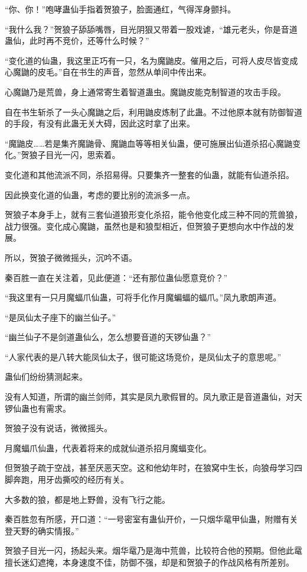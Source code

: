 \begin{this_body}
“你、你！”咆哮蛊仙手指着贺狼子，脸面通红，气得浑身颤抖。

“我什么我？”贺狼子舔舔嘴唇，目光阴狠又带着一股戏谑，“雄元老头，你是音道蛊仙，此时再不竞价，还等什么时候？”

“变化道的仙蛊，我这里正巧有一只，名为魔鼬皮。催用之后，可将人皮尽皆变成心魔鼬的皮毛。”自在书生的声音，忽然从单间中传出来。

心魔鼬乃是荒兽，身上通常寄生着智道蛊虫。魔鼬皮能克制智道的攻击手段。

自在书生斩杀了一头心魔鼬之后，利用鼬皮炼制了此蛊。不过他原本就有防御智道的手段，有没有此蛊无关大碍，因此这时拿了出来。

“魔鼬皮……若是集齐魔鼬骨、魔鼬血等等相关仙蛊，便可施展出仙道杀招心魔鼬变化。”贺狼子目光一闪，思索着。

变化道和其他流派不同，杀招易得。只要集齐一整套的仙蛊，就能有仙道杀招。

因此换变化道的仙蛊，考虑的要比别的流派多一点。

贺狼子本身手上，就有三套仙道狼形变化杀招，能令他变化成三种不同的荒兽狼，战力很强。变化成心魔鼬，虽然也是和狼型相近，但贺狼子更想向水中作战的发展。

所以，贺狼子微微摇头，沉吟不语。

秦百胜一直在关注着，见此便道：“还有那位蛊仙愿意竞价？”

“我这里有一只月魔蝠爪仙蛊，可将手化作月魔蝙蝠的蝠爪。”凤九歌朗声道。

“是凤仙太子座下的幽兰仙子。”

“幽兰仙子不是剑道蛊仙么，怎么想要音道的天锣仙蛊？”

“人家代表的是八转大能凤仙太子，很可能这场竞价，是凤仙太子的意思呢。”

蛊仙们纷纷猜测起来。

没有人知道，所谓的幽兰剑师，其实是凤九歌假冒的。凤九歌正是音道蛊仙，对天锣仙蛊也有需求。

贺狼子没有说话，微微摇头。

月魔蝠爪仙蛊，代表着将来的成就仙道杀招月魔蝠变化。

但贺狼子疏于空战，甚至厌恶天空。这和他幼年时，在狼窝中生长，向狼母学习四脚奔跑，用牙齿撕咬的经历有关。

大多数的狼，都是地上野兽，没有飞行之能。

秦百胜忽有所感，开口道：“一号密室有蛊仙开价，一只烟华鼋甲仙蛊，附赠有关登天野的确实情报。”

贺狼子目光一闪，扬起头来。烟华鼋乃是海中荒兽，比较符合他的预期。但他此鼋擅长迷幻遮掩，本身速度不佳，防御不强，却是和贺狼子的作战风格有所差别。


\end{this_body}
